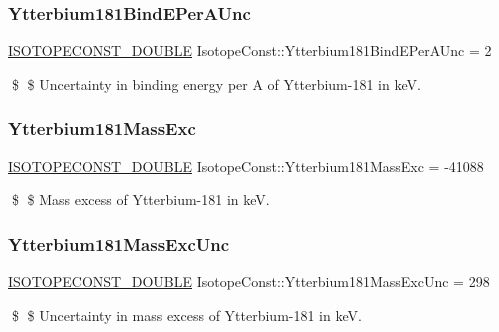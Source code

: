 \subsubsection{\texorpdfstring{Ytterbium181\+Bind\+E\+Per\+A\+Unc}{Ytterbium181BindEPerAUnc}}
{\footnotesize\ttfamily \mbox{\hyperlink{group___isotope_const-_macros_ga8f45a7272ce02c0b4c65c44636ed719a}{I\+S\+O\+T\+O\+P\+E\+C\+O\+N\+S\+T\+\_\+\+D\+O\+U\+B\+LE}} Isotope\+Const\+::\+Ytterbium181\+Bind\+E\+Per\+A\+Unc = 2}

\$ \$ Uncertainty in binding energy per A of Ytterbium-\/181 in keV. \mbox{\label{group___isotope_const-_ytterbium-_yb181_ga9ab8b7e61181b18148a50bdb80812103}} 
\subsubsection{\texorpdfstring{Ytterbium181\+Mass\+Exc}{Ytterbium181MassExc}}
{\footnotesize\ttfamily \mbox{\hyperlink{group___isotope_const-_macros_ga8f45a7272ce02c0b4c65c44636ed719a}{I\+S\+O\+T\+O\+P\+E\+C\+O\+N\+S\+T\+\_\+\+D\+O\+U\+B\+LE}} Isotope\+Const\+::\+Ytterbium181\+Mass\+Exc = -\/41088}

\$ \$ Mass excess of Ytterbium-\/181 in keV. \mbox{\label{group___isotope_const-_ytterbium-_yb181_gaf1b1a8fd71df432a305890eef5623093}} 
\subsubsection{\texorpdfstring{Ytterbium181\+Mass\+Exc\+Unc}{Ytterbium181MassExcUnc}}
{\footnotesize\ttfamily \mbox{\hyperlink{group___isotope_const-_macros_ga8f45a7272ce02c0b4c65c44636ed719a}{I\+S\+O\+T\+O\+P\+E\+C\+O\+N\+S\+T\+\_\+\+D\+O\+U\+B\+LE}} Isotope\+Const\+::\+Ytterbium181\+Mass\+Exc\+Unc = 298}

\$ \$ Uncertainty in mass excess of Ytterbium-\/181 in keV. \mbox{\label{group___isotope_const-_ytterbium-_yb181_ga7d32a162021e9d935cad9b454734eacf}} 
